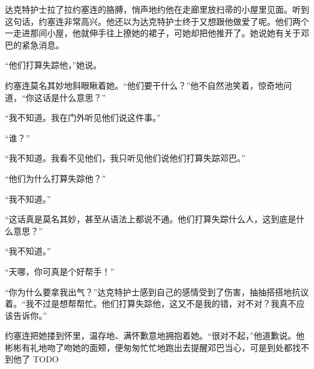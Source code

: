     达克特护士拉了拉约塞连的胳膊，悄声地约他在走廊里放扫帚的小屋里见面。听到这句话，约塞连非常高兴。他还以为达克特护士终于又想跟他做爱了呢。他们两个一走进那间小屋，他就伸手往上撩她的裙子，可她却把他推开了。她说她有关于邓巴的紧急消息。

    “他们打算失踪他，”她说。

    约塞连莫名其妙地斜眼瞅着她。“他们要干什么？”他不自然池笑着，惊奇地问道，“你这话是什么意思？”

    “我不知道。我在门外听见他们说这件事。”

    “谁？”

    “我不知道。我看不见他们，我只听见他们说他们打算失踪邓巴。”

    “他们为什么打算失踪他？”

    “我不知道。”

    “这话真是莫名其妙，甚至从语法上都说不通。他们打算失踪什么人，这到底是什么意思？”

    “我不知道。”

    “天哪，你可真是个好帮手！”

    “你为什么要拿我出气？”达克特护士感到自己的感情受到了伤害，抽抽搭搭地抗议着。“我不过是想帮帮忙。他们打算失踪他，这又不是我的错，对不对？我真不应该告诉你。”

    约塞连把她搂到怀里，温存地、满怀歉意地拥抱着她。“很对不起，”他道歉说。他彬彬有礼地吻了吻她的面颊，便匆匆忙忙地跑出去提醒邓巴当心，可是到处都找不到他了
TODO
